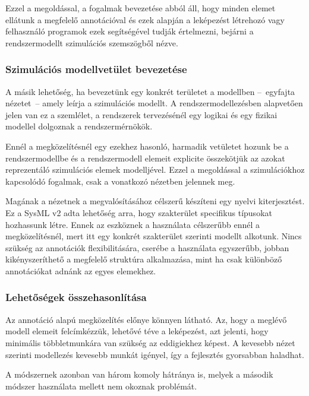         Ezzel a megoldással, a fogalmak bevezetése abból áll, hogy minden elemet ellátunk a megfelelő annotációval és ezek alapján a leképezést létrehozó vagy felhasználó programok ezek segítségével tudják értelmezni, bejárni a rendszermodellt szimulációs szemszögből nézve.

        \subsubsection{Szimulációs modellvetület bevezetése}
        A másik lehetőség, ha bevezetünk egy konkrét területet a modellben --~egyfajta nézetet~-- amely leírja a szimulációs modellt.
        A rendszermodellezésben alapvetően jelen van ez a szemlélet, a rendszerek tervezésénél egy logikai és egy fizikai modellel dolgoznak a rendszermérnökök.
        
        Ennél a megközelítésnél egy ezekhez hasonló, harmadik vetületet hozunk be a rendszermodellbe és a rendszermodell elemeit explicite összekötjük az azokat reprezentáló szimulációs elemek modelljével.
        Ezzel a megoldással a szimulációkhoz kapcsolódó fogalmak, csak a vonatkozó nézetben jelennek meg.
        
        Magának a nézetnek a megvalósításához célszerű készíteni egy nyelvi kiterjesztést.
        Ez a SysML v2 adta lehetőség arra, hogy szakterület specifikus típusokat hozhassunk létre.
        Ennek az eszköznek a használata célszerűbb ennél a megközelítésnél, mert itt egy konkrét szakterület szerinti modellt alkotunk.
        Nincs szükség az annotációk flexibilitására, cserébe a használata egyszerűbb, jobban kikényszeríthető a megfelelő struktúra alkalmazása, mint ha csak különböző annotációkat adnánk az egyes elemekhez.

        \subsubsection{Lehetőségek összehasonlítása} \label{sec:ReMoOsszehasonlitas}
        Az annotáció alapú megközelítés előnye könnyen látható. Az, hogy a meglévő modell elemeit felcímkézzük, lehetővé téve a leképezést, azt jelenti, hogy minimális többletmunkára van szükség az eddigiekhez képest.
        A kevesebb nézet szerinti modellezés kevesebb munkát igényel, így a fejlesztés gyorsabban haladhat.
        
        A módszernek azonban van három komoly hátránya is, melyek a második módszer használata mellett nem okoznak problémát.


